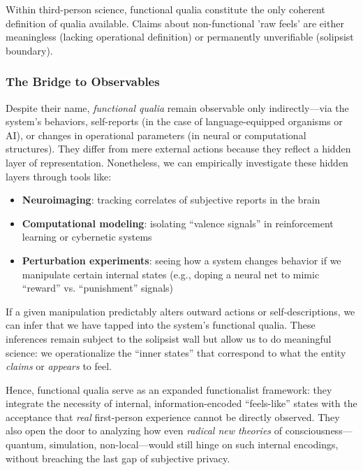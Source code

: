 \documentclass[12pt,letterpaper]{article}
\begin{document}
Within third-person science, functional qualia constitute the only coherent definition of qualia available. Claims about non-functional 'raw feels' are either meaningless (lacking operational definition) or permanently unverifiable (solipsist boundary).

\subsubsection{The Bridge to Observables}

Despite their name, \textit{functional qualia} remain observable only indirectly---via the system's behaviors, self-reports (in the case of language-equipped organisms or AI), or changes in operational parameters (in neural or computational structures). They differ from mere external actions because they reflect a hidden layer of representation. Nonetheless, we can empirically investigate these hidden layers through tools like:

\begin{itemize}
    \item \textbf{Neuroimaging}: tracking correlates of subjective reports in the brain
    \item \textbf{Computational modeling}: isolating ``valence signals'' in reinforcement learning or cybernetic systems
    \item \textbf{Perturbation experiments}: seeing how a system changes behavior if we manipulate certain internal states (e.g., doping a neural net to mimic ``reward'' vs. ``punishment'' signals)
\end{itemize}

If a given manipulation predictably alters outward actions or self-descriptions, we can infer that we have tapped into the system's functional qualia. These inferences remain subject to the solipsist wall but allow us to do meaningful science: we operationalize the ``inner states'' that correspond to what the entity \textit{claims} or \textit{appears} to feel.

Hence, functional qualia serve as an expanded functionalist framework: they integrate the necessity of internal, information-encoded ``feels-like'' states with the acceptance that \textit{real} first-person experience cannot be directly observed. They also open the door to analyzing how even \textit{radical new theories} of consciousness---quantum, simulation, non-local---would still hinge on such internal encodings, without breaching the last gap of subjective privacy.
\end{document}
